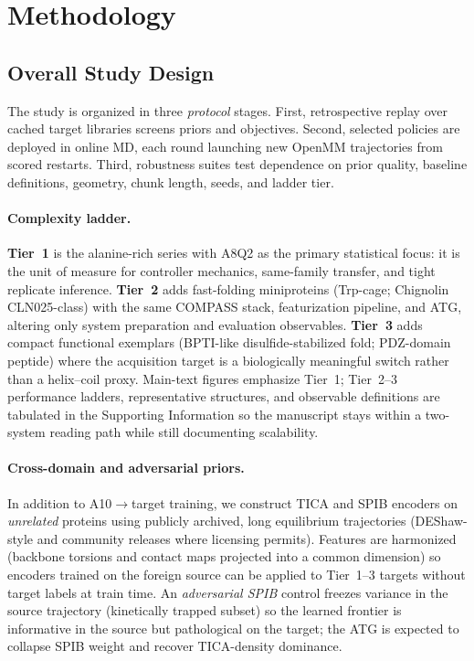 \documentclass[journal=jctcce,manuscript=article,layout=twocolumn]{achemso}
\begin{document}
\section{Methodology}

\subsection{Overall Study Design}

The study is organized in three \emph{protocol} stages. First, retrospective replay over cached target libraries screens priors and objectives. Second, selected policies are deployed in online MD, each round launching new OpenMM trajectories from scored restarts. Third, robustness suites test dependence on prior quality, baseline definitions, geometry, chunk length, seeds, and ladder tier.

\paragraph{Complexity ladder.} \textbf{Tier~1} is the alanine-rich series with A8Q2 as the primary statistical focus: it is the unit of measure for controller mechanics, same-family transfer, and tight replicate inference. \textbf{Tier~2} adds fast-folding miniproteins (Trp-cage; Chignolin CLN025-class) with the same COMPASS stack, featurization pipeline, and ATG, altering only system preparation and evaluation observables. \textbf{Tier~3} adds compact functional exemplars (BPTI-like disulfide-stabilized fold; PDZ-domain peptide) where the acquisition target is a biologically meaningful switch rather than a helix--coil proxy. Main-text figures emphasize Tier~1; Tier~2--3 performance ladders, representative structures, and observable definitions are tabulated in the Supporting Information so the manuscript stays within a two-system reading path while still documenting scalability.

\paragraph{Cross-domain and adversarial priors.} In addition to A10$\to$target training, we construct TICA and SPIB encoders on \emph{unrelated} proteins using publicly archived, long equilibrium trajectories (DEShaw-style and community releases where licensing permits). Features are harmonized (backbone torsions and contact maps projected into a common dimension) so encoders trained on the foreign source can be applied to Tier~1--3 targets without target labels at train time. An \emph{adversarial SPIB} control freezes variance in the source trajectory (kinetically trapped subset) so the learned frontier is informative in the source but pathological on the target; the ATG is expected to collapse SPIB weight and recover TICA-density dominance.
\end{document}
